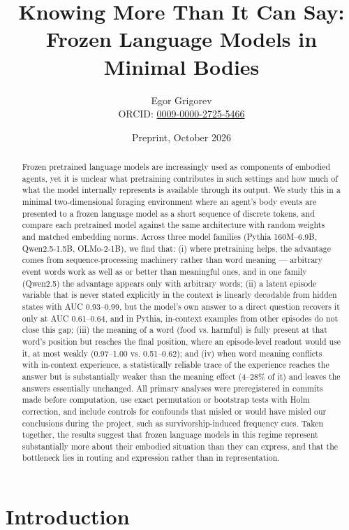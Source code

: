 \documentclass[11pt]{article}
\title{Knowing More Than It Can Say: Frozen Language Models in Minimal Bodies}
\author{Egor Grigorev\\ ORCID: \href{https://orcid.org/0009-0000-2725-5466}{0009-0000-2725-5466}}
\date{Preprint, October 2026}
\begin{document}
\maketitle
\begin{abstract}
Frozen pretrained language models are increasingly used as components of embodied agents, yet it is unclear what pretraining contributes in such settings and how much of what the model internally represents is available through its output. We study this in a minimal two-dimensional foraging environment where an agent's body events are presented to a frozen language model as a short sequence of discrete tokens, and compare each pretrained model against the same architecture with random weights and matched embedding norms. Across three model families (Pythia 160M--6.9B, Qwen2.5-1.5B, OLMo-2-1B), we find that: (i) where pretraining helps, the advantage comes from sequence-processing machinery rather than word meaning --- arbitrary event words work as well as or better than meaningful ones, and in one family (Qwen2.5) the advantage appears only with arbitrary words; (ii) a latent episode variable that is never stated explicitly in the context is linearly decodable from hidden states with AUC 0.93--0.99, but the model's own answer to a direct question recovers it only at AUC 0.61--0.64, and in Pythia, in-context examples from other episodes do not close this gap; (iii) the meaning of a word (food vs. harmful) is fully present at that word's position but reaches the final position, where an episode-level readout would use it, at most weakly (0.97--1.00 vs. 0.51--0.62); and (iv) when word meaning conflicts with in-context experience, a statistically reliable trace of the experience reaches the answer but is substantially weaker than the meaning effect (4--28\% of it) and leaves the answers essentially unchanged. All primary analyses were preregistered in commits made before computation, use exact permutation or bootstrap tests with Holm correction, and include controls for confounds that misled or would have misled our conclusions during the project, such as survivorship-induced frequency cues. Taken together, the results suggest that frozen language models in this regime represent substantially more about their embodied situation than they can express, and that the bottleneck lies in routing and expression rather than in representation.
\end{abstract}

\section{Introduction}\label{sec:intro}
\end{document}
